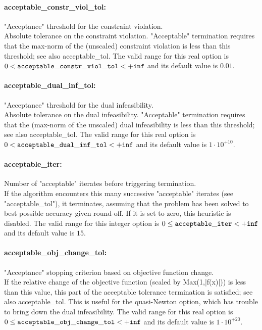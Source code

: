 \paragraph{acceptable\_constr\_viol\_tol:}\label{sec:acceptable_constr_viol_tol} "Acceptance" threshold for the constraint violation. $\;$ \\
 Absolute tolerance on the constraint violation.
"Acceptable" termination requires that the
max-norm of the (unscaled) constraint violation
is less than this threshold; see also
acceptable\_tol. The valid range for this real option is 
$0 <  {\tt acceptable\_constr\_viol\_tol } <  {\tt +inf}$
and its default value is $0.01$.


\paragraph{acceptable\_dual\_inf\_tol:}\label{sec:acceptable_dual_inf_tol} "Acceptance" threshold for the dual infeasibility. $\;$ \\
 Absolute tolerance on the dual infeasibility.
"Acceptable" termination requires that the
(max-norm of the unscaled) dual infeasibility is
less than this threshold; see also
acceptable\_tol. The valid range for this real option is 
$0 <  {\tt acceptable\_dual\_inf\_tol } <  {\tt +inf}$
and its default value is $1 \cdot 10^{+10}$.


\paragraph{acceptable\_iter:}\label{sec:acceptable_iter} Number of "acceptable" iterates before triggering termination. $\;$ \\
 If the algorithm encounters this many successive
"acceptable" iterates (see "acceptable\_tol"), it
terminates, assuming that the problem has been
solved to best possible accuracy given round-off.
 If it is set to zero, this heuristic is disabled. The valid range for this integer option is
$0 \le {\tt acceptable\_iter } <  {\tt +inf}$
and its default value is $15$.


\paragraph{acceptable\_obj\_change\_tol:}\label{sec:acceptable_obj_change_tol} "Acceptance" stopping criterion based on objective function change. $\;$ \\
 If the relative change of the objective function
(scaled by Max(1,|f(x)|)) is less than this
value, this part of the acceptable tolerance
termination is satisfied; see also
acceptable\_tol.  This is useful for the
quasi-Newton option, which has trouble to bring
down the dual infeasibility. The valid range for this real option is 
$0 \le {\tt acceptable\_obj\_change\_tol } <  {\tt +inf}$
and its default value is $1 \cdot 10^{+20}$.


